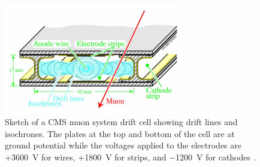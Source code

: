 \begin{figure}
\centering
\includegraphics[width=0.7\textwidth]{figures/lhc_and_cms/drift_cell}
\caption{Sketch of a CMS muon system drift cell showing drift lines and isochrones.  The plates at the top and bottom of the cell are at ground potential while the voltages applied to the electrodes are +\SI{+3600}{\V} for wires, +\SI{1800}{\V} for strips, and \SI{-1200}{\V} for cathodes \cite{cms_experiment}.}
\label{drift_cell}
\end{figure}